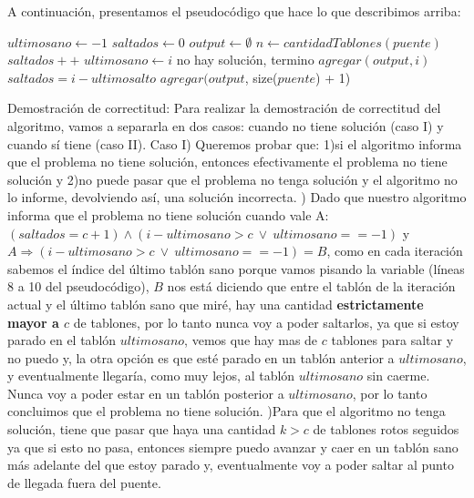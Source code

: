 \documentclass{article}
\begin{document}
A continuaci\'on, presentamos el pseudoc\'odigo que hace lo que describimos arriba:
\vspace{0.4cm}
\begin{algorithmic}[1]
	\State $ultimosano\gets -1$
	\State $saltados\gets 0$
	\State $output\gets \emptyset$
	\State $n\gets cantidadTablones(puente)$
		\State $saltados++$
			\State $ultimosano\gets i$
		\EndIf
				\State no hay soluci\'on, termino
			\EndIf
			\State $agregar(output, i)$
			\State $saltados = i - ultimosalto$
		\EndIf
	\EndFor
	\State $agregar(output$, size($puente$) + 1)
\EndProcedure
\end{algorithmic}
\vspace{1cm}
{\noindent \Huge Demostraci\'on de correctitud:}
\newline
\newline Para realizar la demostraci\'on de correctitud del algoritmo, vamos a separarla en dos casos: cuando no tiene soluci\'on (caso I) y cuando s\'i tiene (caso II).
\newline
\newline Caso I) Queremos probar que: 1)si el algoritmo informa que el problema no tiene soluci\'on, entonces efectivamente el problema no tiene soluci\'on y 2)no puede pasar que el problema no tenga soluci\'on y el algoritmo no lo informe, devolviendo as\'i, una soluci\'on incorrecta.
) Dado que nuestro algoritmo informa que el problema no tiene soluci\'on cuando vale A: $(saltados = c + 1) \wedge (i - ultimosano > c \ \vee \ ultimosano == -1)$ y $A\Rightarrow (i - ultimosano > c \ \vee \ ultimosano == -1) = B$, como en cada iteraci\'on sabemos el \'indice del \'ultimo tabl\'on sano porque vamos pisando la variable (l\'ineas 8 a 10 del pseudoc\'odigo), $B$ nos est\'a diciendo que entre el tabl\'on de la iteraci\'on actual y el \'ultimo tabl\'on sano que mir\'e, hay una cantidad \textbf{estrictamente mayor a $c$} de tablones, por lo tanto nunca voy a poder saltarlos, ya que si estoy parado en el tabl\'on $ultimosano$, vemos que hay mas de $c$ tablones para saltar y no puedo y, la otra opci\'on es que est\'e parado en un tabl\'on anterior a $ultimosano$, y eventualmente llegar\'ia, como muy lejos, al tabl\'on $ultimosano$ sin caerme. Nunca voy a poder estar en un tabl\'on posterior a $ultimosano$, por lo tanto concluimos que el problema no tiene soluci\'on.
)Para que el algoritmo no tenga soluci\'on, tiene que pasar que haya una cantidad $k > c$ de tablones rotos seguidos ya que si esto no pasa, entonces siempre puedo avanzar y caer en un tabl\'on sano m\'as adelante del que estoy parado y, eventualmente voy a poder saltar al punto de llegada fuera del puente.
\end{document}
